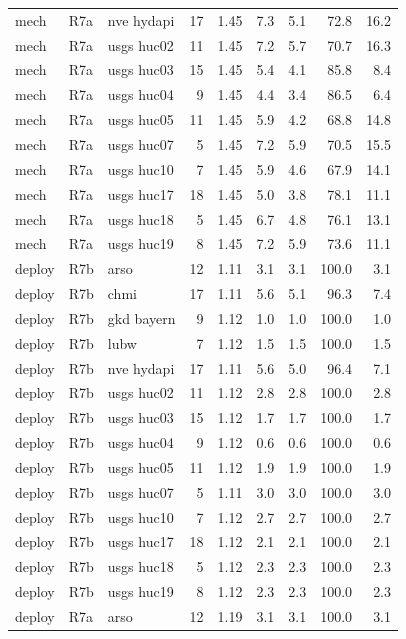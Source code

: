 \begin{table}
{\begin{tabular}{lllrrrrrr}
mech & R7a & nve hydapi & 17 & 1.45 & 7.3 & 5.1 & 72.8 & 16.2 \\
mech & R7a & usgs huc02 & 11 & 1.45 & 7.2 & 5.7 & 70.7 & 16.3 \\
mech & R7a & usgs huc03 & 15 & 1.45 & 5.4 & 4.1 & 85.8 & 8.4 \\
mech & R7a & usgs huc04 & 9 & 1.45 & 4.4 & 3.4 & 86.5 & 6.4 \\
mech & R7a & usgs huc05 & 11 & 1.45 & 5.9 & 4.2 & 68.8 & 14.8 \\
mech & R7a & usgs huc07 & 5 & 1.45 & 7.2 & 5.9 & 70.5 & 15.5 \\
mech & R7a & usgs huc10 & 7 & 1.45 & 5.9 & 4.6 & 67.9 & 14.1 \\
mech & R7a & usgs huc17 & 18 & 1.45 & 5.0 & 3.8 & 78.1 & 11.1 \\
mech & R7a & usgs huc18 & 5 & 1.45 & 6.7 & 4.8 & 76.1 & 13.1 \\
mech & R7a & usgs huc19 & 8 & 1.45 & 7.2 & 5.9 & 73.6 & 11.1 \\
deploy & R7b & arso & 12 & 1.11 & 3.1 & 3.1 & 100.0 & 3.1 \\
deploy & R7b & chmi & 17 & 1.11 & 5.6 & 5.1 & 96.3 & 7.4 \\
deploy & R7b & gkd bayern & 9 & 1.12 & 1.0 & 1.0 & 100.0 & 1.0 \\
deploy & R7b & lubw & 7 & 1.12 & 1.5 & 1.5 & 100.0 & 1.5 \\
deploy & R7b & nve hydapi & 17 & 1.11 & 5.6 & 5.0 & 96.4 & 7.1 \\
deploy & R7b & usgs huc02 & 11 & 1.12 & 2.8 & 2.8 & 100.0 & 2.8 \\
deploy & R7b & usgs huc03 & 15 & 1.12 & 1.7 & 1.7 & 100.0 & 1.7 \\
deploy & R7b & usgs huc04 & 9 & 1.12 & 0.6 & 0.6 & 100.0 & 0.6 \\
deploy & R7b & usgs huc05 & 11 & 1.12 & 1.9 & 1.9 & 100.0 & 1.9 \\
deploy & R7b & usgs huc07 & 5 & 1.11 & 3.0 & 3.0 & 100.0 & 3.0 \\
deploy & R7b & usgs huc10 & 7 & 1.12 & 2.7 & 2.7 & 100.0 & 2.7 \\
deploy & R7b & usgs huc17 & 18 & 1.12 & 2.1 & 2.1 & 100.0 & 2.1 \\
deploy & R7b & usgs huc18 & 5 & 1.12 & 2.3 & 2.3 & 100.0 & 2.3 \\
deploy & R7b & usgs huc19 & 8 & 1.12 & 2.3 & 2.3 & 100.0 & 2.3 \\
deploy & R7a & arso & 12 & 1.19 & 3.1 & 3.1 & 100.0 & 3.1 \\

\end{tabular}}
\end{table}
